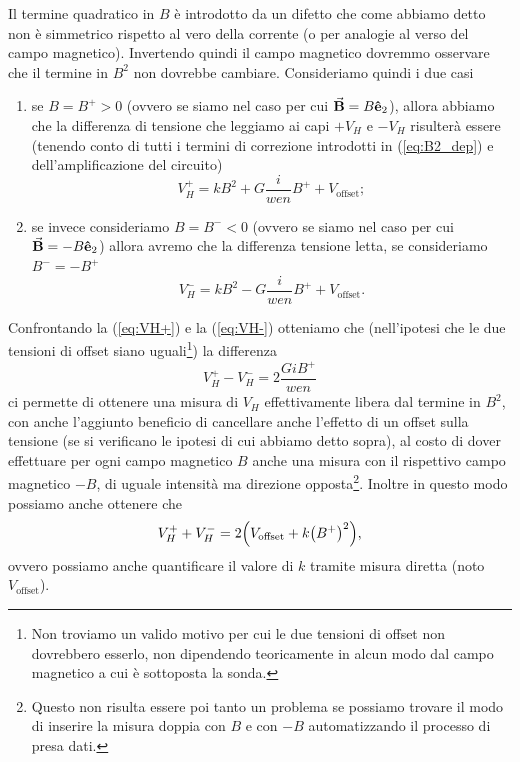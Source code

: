 \documentclass[fleqn,varvw,preprintnumbers,citeautoscript]{memo}
\begin{document}
Il termine quadratico in $B$ è introdotto da un difetto che come abbiamo detto non è simmetrico rispetto al vero della corrente (o per analogie al verso del campo magnetico). Invertendo quindi il campo magnetico dovremmo osservare che il termine in $B^2$ non dovrebbe cambiare. Consideriamo quindi i due casi \begin{enumerate}[1.]
    \item se $B=B^+>0$ (ovvero se siamo nel caso per cui $\va{B} = B\vu{e}_2$), allora abbiamo che la differenza di tensione che leggiamo ai capi $+V_H$ e $-V_H$ risulterà essere (tenendo conto di tutti i termini di correzione introdotti in (\ref{eq:B2_dep}) e dell'amplificazione del circuito) \begin{equation}
        V_H^+ = kB^2 + G\frac{i}{wen}B^+ + V_\text{offset};\label{eq:VH+}
    \end{equation}
    \item se invece consideriamo $B=B^-<0$ (ovvero se siamo nel caso per cui $\va{B} = -B\vu{e}_2$) allora avremo che la differenza tensione letta, se consideriamo $B^- = -B^+$ \begin{equation}
        V_H^- = kB^2 - G\frac{i}{wen}B^+ + V_\text{offset}.\label{eq:VH-}
    \end{equation}
\end{enumerate}
Confrontando la (\ref{eq:VH+}) e la (\ref{eq:VH-}) otteniamo che (nell'ipotesi che le due tensioni di offset siano uguali\footnote{Non troviamo un valido motivo per cui le due tensioni di offset non dovrebbero esserlo, non dipendendo teoricamente in alcun modo dal campo magnetico a cui è sottoposta la sonda.}) la differenza \begin{equation}
    V_H^+ - V_H^- = 2\frac{GiB^+}{wen}
\end{equation} ci permette di ottenere una misura di $V_H$ effettivamente libera dal termine in $B^2$, con anche l'aggiunto beneficio di cancellare anche l'effetto di un offset sulla tensione (se si verificano le ipotesi di cui abbiamo detto sopra), al costo di dover effettuare per ogni campo magnetico $B$ anche una misura con il rispettivo campo magnetico $-B$, di uguale intensità ma direzione opposta\footnote{Questo non risulta essere poi tanto un problema se possiamo trovare il modo di inserire la misura doppia con $B$ e con $-B$ automatizzando il processo di presa dati.}. Inoltre in questo modo possiamo anche ottenere che \begin{equation}
    V_H^++V_H^- = 2\qty(V_\text{offset} + k\qty(B^+)^2),
\end{equation} ovvero possiamo anche quantificare il valore di $k$ tramite misura diretta (noto $V_\text{offset}$).
\end{document}
